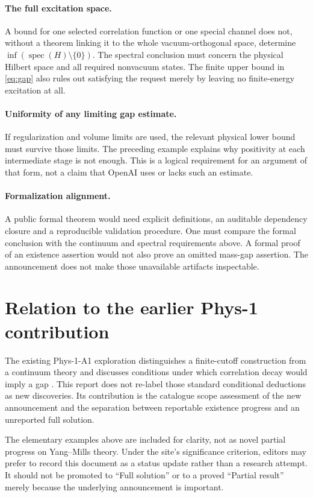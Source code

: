 \documentclass[11pt,a4paper]{article}
\numberwithin{equation}{section}
\theoremstyle{definition}
\theoremstyle{remark}
\newcommand{\spec}{\operatorname{spec}}
\begin{document}
\paragraph{The full excitation space.}
A bound for one selected correlation function or one special channel does not,
without a theorem linking it to the whole vacuum-orthogonal space, determine
$\inf(\spec(H)\setminus\{0\})$. The spectral conclusion must concern the
physical Hilbert space and all required nonvacuum states. The finite upper
bound in \eqref{eq:gap} also rules out satisfying the request merely by leaving
no finite-energy excitation at all.

\paragraph{Uniformity of any limiting gap estimate.}
If regularization and volume limits are used, the relevant physical lower bound
must survive those limits. The preceding example explains why positivity at
each intermediate stage is not enough. This is a logical requirement for an
argument of that form, not a claim that OpenAI uses or lacks such an estimate.

\paragraph{Formalization alignment.}
A public formal theorem would need explicit definitions, an auditable dependency
closure and a reproducible validation procedure. One must compare the formal
conclusion with the continuum and spectral requirements above. A formal proof
of an existence assertion would not also prove an omitted mass-gap assertion.
The announcement does not make those unavailable artifacts inspectable.

\section{Relation to the earlier Phys-1 contribution}
The existing Phys-1-A1 exploration distinguishes a finite-cutoff construction
from a continuum theory and discusses conditions under which correlation decay
would imply a gap \cite{catalogue}. This report does not re-label those standard
conditional deductions as new discoveries. Its contribution is the catalogue
scope assessment of the new announcement and the separation between reportable
existence progress and an unreported full solution.

The elementary examples above are included for clarity, not as novel partial
progress on Yang--Mills theory. Under the site's significance criterion,
editors may prefer to record this document as a status update rather than a
research attempt. It should not be promoted to ``Full solution'' or to a proved
``Partial result'' merely because the underlying announcement is important.
\end{document}
